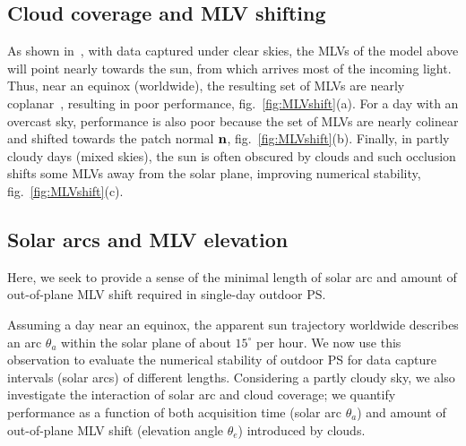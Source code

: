 \subsection{Cloud coverage and MLV shifting}
\label{subsec:mlv-clouds}

As shown in~\cite{holdgeoffroy-iccp-15}, with data captured under clear skies, the MLVs of the model above will point nearly towards the sun, from which arrives most of the incoming light. Thus, near an equinox (worldwide), the resulting set of MLVs are nearly coplanar~\cite{shen-pg-14}, resulting in poor performance, fig.~\ref{fig:MLVshift}(a). For a day with an overcast sky, performance is also poor because the set of MLVs are nearly colinear and shifted towards the patch normal ${\bf n}$, fig.~\ref{fig:MLVshift}(b). Finally, in partly cloudy days (mixed skies), the sun is often obscured by clouds and such occlusion shifts some MLVs away from the solar plane, improving numerical stability, fig.~\ref{fig:MLVshift}(c). 



\subsection{Solar arcs and MLV elevation}
\label{subsec:solararcs-mlvelevation}


Here, we seek to provide a sense of the minimal length of solar arc and amount of out-of-plane MLV shift required in single-day outdoor PS.

Assuming a day near an equinox, the apparent sun trajectory worldwide describes an arc $\theta_a$ within the solar plane of about $15^\circ$ per hour. We now use this observation to evaluate the numerical stability of outdoor PS for data capture intervals (solar arcs) of different lengths. Considering a partly cloudy sky, we also investigate the interaction of solar arc and cloud coverage; we quantify performance as a function of both acquisition time (solar arc $\theta_a$) and amount of out-of-plane MLV shift (elevation angle $\theta_e$) introduced by clouds.

